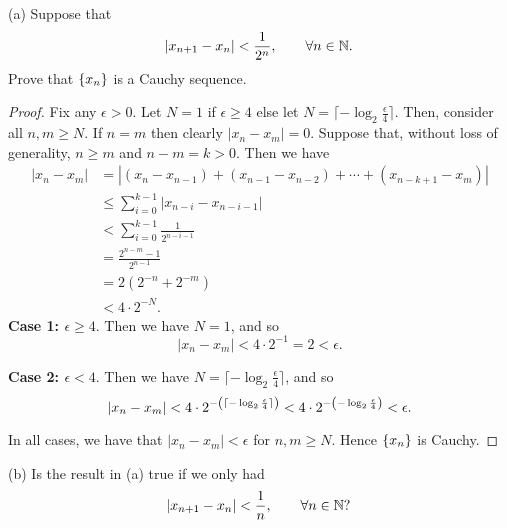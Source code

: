 \documentclass{article}
\newcommand{\N}{\mathbb{N}}
\begin{document}
(a) Suppose that
%
\begin{equation*}
    \envert{x_{n+1} - x_n} < \frac{1}{2^n}, \qquad \forall n \in \N
    .
\end{equation*}
%
Prove that $\cbr{x_n}$ is a Cauchy sequence.

\begin{proof}

Fix any $\epsilon > 0$. Let $N = 1$ if $\epsilon \geq 4$ else let $N =
\lceil - \log_2 \frac{\epsilon}{4} \rceil$. Then, consider all $n, m
\geq N$. If $n = m$ then clearly $|x_n - x_m| = 0$. Suppose that,
without loss of generality, $n \geq m$ and $n - m = k > 0$. Then we have
%
\begin{align*}
    |x_n - x_m|
        &= |(x_n - x_{n - 1}) + (x_{n - 1} - x_{n - 2}) + \cdots + (x_{n - k + 1} - x_m)| \\
        &\leq \sum_{i = 0}^{k - 1} |x_{n - i} - x_{n - i - 1}| \\
        &< \sum_{i = 0}^{k - 1} \frac{1}{2^{n - i - 1}} \\
        &= \frac{2^{n - m} - 1}{2^{n - 1}} \\
        &= 2 (2^{-n} + 2^{-m}) \\
        &< 4 \cdot 2^{-N}
        .
\end{align*}
%
\textbf{Case 1: $\epsilon \geq 4$}. Then we have $N = 1$, and so
%
\begin{equation*}
    |x_n - x_m| < 4 \cdot 2^{-1} = 2 < \epsilon
        .
\end{equation*}

\textbf{Case 2: $\epsilon < 4$}. Then we have $N = \lceil - \log_2
\frac{\epsilon}{4} \rceil$, and so
%
\begin{equation*}
    |x_n - x_m|
        < 4 \cdot 2^{- \del{\lceil - \log_2 \frac{\epsilon}{4} \rceil}}
        < 4 \cdot 2^{- \del{- \log_2 \frac{\epsilon}{4}}}
        < \epsilon
        .
\end{equation*}

In all cases, we have that $|x_n - x_m| < \epsilon$ for $n, m \geq N$.
Hence $\cbr{x_n}$ is Cauchy.

\end{proof}

\newpage

(b) Is the result in (a) true if we only had
%
\begin{equation*}
    \envert{x_{n+1} - x_n} < \frac{1}{n}, \qquad \forall n \in \N
    ?
\end{equation*}
\end{document}
